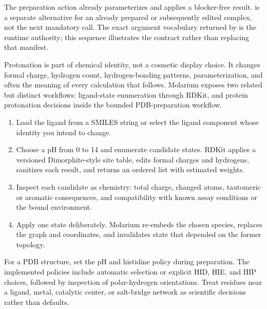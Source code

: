 The preparation action already parameterizes and applies a blocker-free result.  is a separate alternative for an already prepared or subsequently edited complex, not the next mandatory call. The exact argument vocabulary returned by  is the runtime authority; this sequence illustrates the contract rather than replacing that manifest.


Protonation is part of chemical identity, not a cosmetic display choice. It changes formal charge, hydrogen count, hydrogen-bonding patterns, parameterization, and often the meaning of every calculation that follows. Molarium exposes two related but distinct workflows: ligand-state enumeration through RDKit, and protein protonation decisions inside the bounded PDB-preparation workflow.


\begin{enumerate}
\item Load the ligand from a SMILES string or select the ligand component whose identity you intend to change.
\item Choose a pH from 0 to 14 and enumerate candidate states. RDKit applies a versioned Dimorphite-style site table, edits formal charges and hydrogens, sanitizes each result, and returns an ordered list with estimated weights.
\item Inspect each candidate as chemistry: total charge, changed atoms, tautomeric or aromatic consequences, and compatibility with known assay conditions or the bound environment.
\item Apply one state deliberately. Molarium re-embeds the chosen species, replaces the graph and coordinates, and invalidates state that depended on the former topology.
\end{enumerate}


For a PDB structure, set the pH and histidine policy during preparation. The implemented policies include automatic selection or explicit HID, HIE, and HIP choices, followed by inspection of polar-hydrogen orientations. Treat residues near a ligand, metal, catalytic center, or salt-bridge network as scientific decisions rather than defaults.

